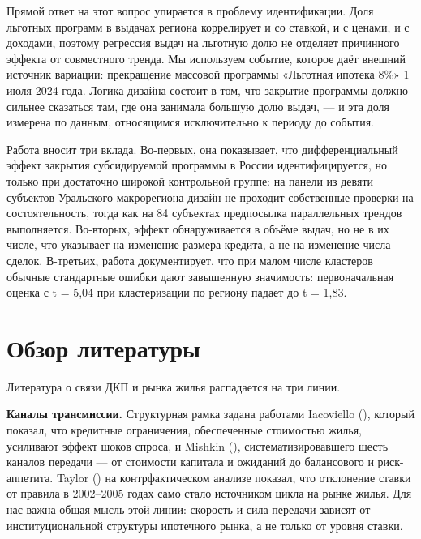 \documentclass[
  russian,
  11pt,
]{article}
\begin{document}
Прямой ответ на этот вопрос упирается в проблему идентификации. Доля
льготных программ в выдачах региона коррелирует и со ставкой, и с
ценами, и с доходами, поэтому регрессия выдач на льготную долю не
отделяет причинного эффекта от совместного тренда. Мы используем
событие, которое даёт внешний источник вариации: прекращение массовой
программы «Льготная ипотека 8\%» 1 июля 2024 года. Логика дизайна
состоит в том, что закрытие программы должно сильнее сказаться там, где
она занимала большую долю выдач, --- и эта доля измерена по данным,
относящимся исключительно к периоду до события.

Работа вносит три вклада. Во-первых, она показывает, что
дифференциальный эффект закрытия субсидируемой программы в России
идентифицируется, но только при достаточно широкой контрольной группе:
на панели из девяти субъектов Уральского макрорегиона дизайн не проходит
собственные проверки на состоятельность, тогда как на 84 субъектах
предпосылка параллельных трендов выполняется. Во-вторых, эффект
обнаруживается в объёме выдач, но не в их числе, что указывает на
изменение размера кредита, а не на изменение числа сделок. В-третьих,
работа документирует, что при малом числе кластеров обычные стандартные
ошибки дают завышенную значимость: первоначальная оценка с t = 5,04 при
кластеризации по региону падает до t = 1,83.

\section{Обзор
литературы}\label{ux43eux431ux437ux43eux440-ux43bux438ux442ux435ux440ux430ux442ux443ux440ux44b}

Литература о связи ДКП и рынка жилья распадается на три линии.

\textbf{Каналы трансмиссии.} Структурная рамка задана работами
Iacoviello (), который показал,
что кредитные ограничения, обеспеченные стоимостью жилья, усиливают
эффект шоков спроса, и Mishkin (),
систематизировавшего шесть каналов передачи --- от стоимости капитала и
ожиданий до балансового и риск-аппетита. Taylor
() на контрфактическом анализе
показал, что отклонение ставки от правила в 2002--2005 годах само стало
источником цикла на рынке жилья. Для нас важна общая мысль этой линии:
скорость и сила передачи зависят от институциональной структуры
ипотечного рынка, а не только от уровня ставки.
\end{document}
